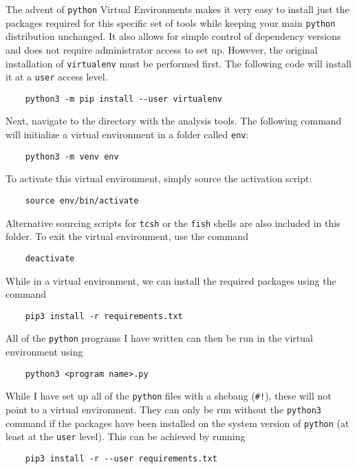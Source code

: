 \documentclass[12pt]{article}
\begin{document}
The advent of \texttt{python} Virtual Environments makes it very easy to install just the packages required for this specific set of tools while keeping your main \texttt{python} distribution unchanged. It also allows for simple control of dependency versions and does not require administrator access to set up. However, the original installation of \texttt{virtualenv} must be performed first. The following code will install it at a \texttt{user} access level.
\begin{verbatim}
    python3 -m pip install --user virtualenv
\end{verbatim}

Next, navigate to the directory with the analysis tools. The following command will initialize a virtual environment in a folder called \texttt{env}:
\begin{verbatim}
    python3 -m venv env
\end{verbatim}

To activate this virtual environment, simply source the activation script:
\begin{verbatim}
    source env/bin/activate
\end{verbatim}
Alternative sourcing scripts for \texttt{tcsh} or the \texttt{fish} shells are also included in this folder. To exit the virtual environment, use the command
\begin{verbatim}
    deactivate
\end{verbatim}

While in a virtual environment, we can install the required packages using the command
\begin{verbatim}
    pip3 install -r requirements.txt
\end{verbatim}

All of the \texttt{python} programs I have written can then be run in the virtual environment using
\begin{verbatim}
    python3 <program name>.py
\end{verbatim}


While I have set up all of the \texttt{python} files with a shebang (\verb|#!|), these will not point to a virtual environment. They can only be run without the \texttt{python3} command if the packages have been installed on the system version of \texttt{python} (at least at the \texttt{user} level). This can be achieved by running
\begin{verbatim}
    pip3 install -r --user requirements.txt
\end{verbatim}
\end{document}
